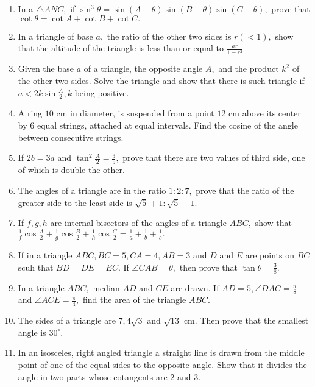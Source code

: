 \begin{enumerate}
\item In a $\triangle ANC,$ if $\sin^3\theta = \sin(A - \theta)\sin(B - \theta)\sin(C - \theta),$ prove that $\cot\theta
    = \cot A + \cot B + \cot C.$

\item In a triangle of base $a,$ the ratio of the other two sides is $r(< 1),$ show that the altitude of the triangle is
    less than or equal to $\frac{ar}{1 - r^2}$

\item Given the base $a$ of a triangle, the opposite angle $A,$ and the product $k^2$ of the other two sides. Solve
    the triangle and show that there is such triangle if $a < 2k\sin\frac{A}{2}, k$ being positive.

\item A ring $10$ cm in diameter, is suspended from a point $12$ cm above its center by $6$ equal strings, attached
    at equal intervals. Find the cosine of the angle between consecutive strings.

\item If $2b = 3a$ and $\tan^2\frac{A}{2} = \frac{3}{5},$ prove that there are two values of third side, one of which is
    double the other.

\item The angles of a triangle are in the ratio $1:2:7,$ prove that the ratio of the greater side to the least side is
    $\sqrt{5} + 1:\sqrt{5} - 1.$

\item If $f, g, h$ are internal bisectors of the angles of a triangle $ABC,$ show that
    $\frac{1}{f}\cos\frac{A}{2} + \frac{1}{g}\cos\frac{B}{2} + \frac{1}{h}\cos\frac{C}{2} = \frac{1}{a} + \frac{1}{b} +
    \frac{1}{c}.$

\item If in a triangle $ABC, BC = 5, CA = 4, AB = 3$ and $D$ and $E$ are points on $BC$ scuh that $BD =
    DE = EC.$ If $\angle CAB=\theta,$ then prove that $\tan\theta = \frac{3}{8}.$

\item In a triangle $ABC,$ median $AD$ and $CE$ are drawn. If $AD = 5, \angle DAC = \frac{\pi}{8}$ and
    $\angle ACE = \frac{\pi}{4},$ find the area of the triangle $ABC.$

\item The sides of a triangle are $7, 4\sqrt{3}$ and $\sqrt{13}$ cm. Then prove that the smallest angle is
    $30^\circ.$

\item In an isosceles, right angled triangle a straight line is drawn from the middle point of one of the equal sides to the opposite
    angle. Show that it divides the angle in two parts whose cotangents are $2$ and $3.$


\end{enumerate}
